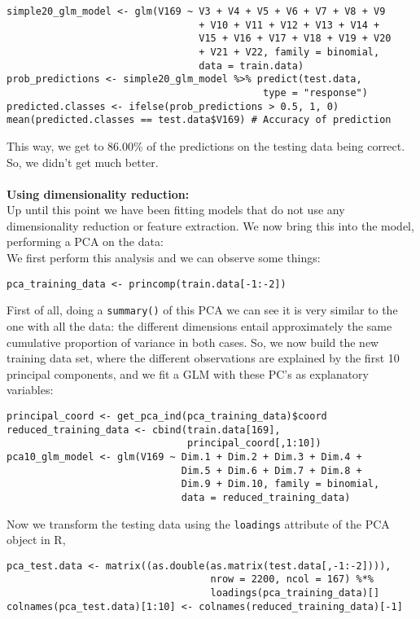 \documentclass[10pt]{article}
\begin{document}
\begin{verbatim}
simple20_glm_model <- glm(V169 ~ V3 + V4 + V5 + V6 + V7 + V8 + V9 
                                 + V10 + V11 + V12 + V13 + V14 + 
                                 V15 + V16 + V17 + V18 + V19 + V20
                                 + V21 + V22, family = binomial,
                                 data = train.data)
prob_predictions <- simple20_glm_model %>% predict(test.data,
                                            type = "response")
predicted.classes <- ifelse(prob_predictions > 0.5, 1, 0)
mean(predicted.classes == test.data$V169) # Accuracy of prediction
\end{verbatim}
This way, we get to 86.00\% of the predictions on the testing data being correct. So, we didn't get much better.
\\ \ \\
\Large{\textbf{Using dimensionality reduction:}}\\
Up until this point we have been fitting models that do not use any dimensionality reduction or feature extraction. We now bring this into the model, performing a PCA on the data:\\
We first perform this analysis and we can observe some things:
\begin{verbatim}
pca_training_data <- princomp(train.data[-1:-2])
\end{verbatim}
First of all, doing a \verb|summary()| of this PCA we can see it is very similar to the one with all the data: the different dimensions entail approximately the same cumulative proportion of variance in both cases. So, we now build the new training data set, where the different observations are explained by the first 10 principal components, and we fit a GLM with these PC's as explanatory variables:
\begin{verbatim}
principal_coord <- get_pca_ind(pca_training_data)$coord
reduced_training_data <- cbind(train.data[169],
                               principal_coord[,1:10])
pca10_glm_model <- glm(V169 ~ Dim.1 + Dim.2 + Dim.3 + Dim.4 +
                              Dim.5 + Dim.6 + Dim.7 + Dim.8 +
                              Dim.9 + Dim.10, family = binomial,
                              data = reduced_training_data)
\end{verbatim}
Now we transform the testing data using the \verb|loadings| attribute of the PCA object in R,
\begin{verbatim}
pca_test.data <- matrix((as.double(as.matrix(test.data[,-1:-2]))),
                                   nrow = 2200, ncol = 167) %*% 
                                   loadings(pca_training_data)[]
colnames(pca_test.data)[1:10] <- colnames(reduced_training_data)[-1]
\end{verbatim}
\end{document}
